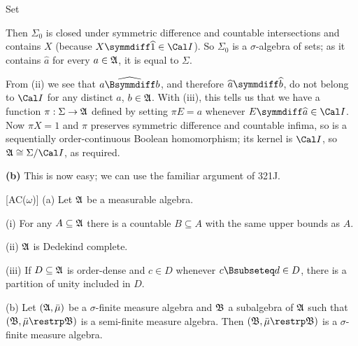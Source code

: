 {\medskip

 Set


\noindent Then $\Sigma_0$ is closed under symmetric difference and
countable intersections and contains $X$ (because
$X\symmdiff\widehat{1}\in\Cal I$).   So $\Sigma_0$ is a $\sigma$-algebra of
sets;  as it contains $\widehat{a}$ for every $a\in\frak A$, it is equal to
$\Sigma$.

\medskip

 From (ii) we see that
$\widehat{a\Bsymmdiff b}$, and therefore $\widehat{a}\symmdiff\widehat{b}$,
do not belong to $\Cal I$ for any distinct $a$, $b\in\frak A$.   With
(iii), this tells us that we have a function $\pi:\Sigma\to\frak A$ defined
by setting $\pi E=a$ whenever $E\symmdiff\widehat{a}\in\Cal I$.   Now
$\pi X=1$ and $\pi$ preserves symmetric difference and countable infima, so
is a sequentially order-continuous Boolean homomorphism;  its kernel is
$\Cal I$, so $\frak A\cong\Sigma/\Cal I$, as required.

\medskip

{\bf (b)} This is now easy;  we can use the familiar argument of 321J.
}%

 [AC($\omega$)]
(a) Let $\frak A$ be a measurable algebra.

\quad(i) For any $A\subseteq\frak A$ there is a countable $B\subseteq A$
with the same upper bounds as $A$.

\quad(ii) $\frak A$ is Dedekind complete.

\quad(iii) If $D\subseteq\frak A$ is order-dense and $c\in D$ whenever
$c\Bsubseteq d\in D$, there is a partition of unity included in $D$.

(b) Let $(\frak A,\bar\mu)$ be a $\sigma$-finite measure algebra and
$\frak B$ a subalgebra of $\frak A$ such that
$(\frak B,\bar\mu\restrp\frak B)$ is a semi-finite measure algebra.
Then $(\frak B,\bar\mu\restrp\frak B)$ is a $\sigma$-finite
measure algebra.

